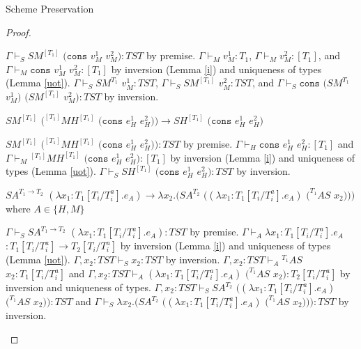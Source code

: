 \begin{theorem}{Scheme Preservation}
\begin{proof}
\begin{case}
$\Gamma\vdash_{S}SM^{[T_{1}]}$ $(\mathtt{cons}$ $v_{M}^{1}$ $v_{M}^{2}):TST$ by premise.  $\Gamma\vdash_{M}v_{M}^{1}:T_{1}$, $\Gamma\vdash_{M}v_{M}^{2}:[T_{1}]$, and $\Gamma\vdash_{M}\mathtt{cons}$ $v_{M}^{1}$ $v_{M}^{2}:[T_{1}]$ by inversion (Lemma \ref{i}) and uniqueness of types (Lemma \ref{uot}).  $\Gamma\vdash_{S}SM^{T_{1}}$ $v_{M}^{1}:TST$, $\Gamma\vdash_{S}SM^{[T_{1}]}$ $v_{M}^{2}:TST$, and $\Gamma\vdash_{S}\mathtt{cons}$ $(SM^{T_{1}}$ $v_{M}^{1})$ $(SM^{[T_{1}]}$ $v_{M}^{2}):TST$ by inversion.
\end{case}


\begin{case}
$SM^{[T_{1}]}$ $(^{[T_{1}]}MH^{[T_{1}]}$ $(\mathtt{cons}$ $e_{H}^{1}$ $e_{H}^{2}))\rightarrow SH^{[T_{1}]}$ $(\mathtt{cons}$ $e_{H}^{1}$ $e_{H}^{2})$

$SM^{[T_{1}]}$ $(^{[T_{1}]}MH^{[T_{1}]}$ $(\mathtt{cons}$ $e_{H}^{1}$ $e_{H}^{2})):TST$ by premise.  $\Gamma\vdash_{H}\mathtt{cons}$ $e_{H}^{1}$ $e_{H}^{2}:[T_{1}]$ and $\Gamma\vdash_{M}{^{[T_{1}]}M}H^{[T_{1}]}$ $(\mathtt{cons}$ $e_{H}^{1}$ $e_{H}^{2}):[T_{1}]$ by inversion (Lemma \ref{i}) and uniqueness of types (Lemma \ref{uot}).  $\Gamma\vdash_{S}SH^{[T_{1}]}$ $(\mathtt{cons}$ $e_{H}^{1}$ $e_{H}^{2}):TST$ by inversion.
\end{case}


\begin{case}
$SA^{T_{1}\rightarrow T_{2}}$ $(\lambda x_{1}:T_{1}[T_{i}/T_{i}^{a}].e_{A})\rightarrow\lambda x_{2}.(SA^{T_{2}}$ $((\lambda x_{1}:T_{1}[T_{i}/T_{i}^{a}].e_{A})$ $(^{T_{1}}AS$ $x_{2})))$ where $A\in\lbrace H,M\rbrace$

$\Gamma\vdash_{S}SA^{T_{1}\rightarrow T_{2}}$ $(\lambda x_{1}:T_{1}[T_{i}/T_{i}^{a}].e_{A}):TST$ by premise.  $\Gamma\vdash_{A}\lambda x_{1}:T_{1}[T_{i}/T_{i}^{a}].e_{A}$ $:T_{1}[T_{i}/T_{i}^{a}]\rightarrow T_{2}[T_{i}/T_{i}^{a}]$ by inversion (Lemma \ref{i}) and uniqueness of types (Lemma \ref{uot}).  $\Gamma,x_{2}:TST\vdash_{S}x_{2}:TST$ by inversion.  $\Gamma,x_{2}:TST\vdash_{A}{^{T_{1}}A}S$ $x_{2}:T_{1}[T_{i}/T_{i}^{a}]$ and $\Gamma,x_{2}:TST\vdash_{A}(\lambda x_{1}:T_{1}[T_{i}/T_{i}^{a}].e_{A})$ $(^{T_{1}}AS$ $x_{2}):T_{2}[T_{i}/T_{i}^{a}]$ by inversion and uniqueness of types.  $\Gamma,x_{2}:TST\vdash_{S}SA^{T_{2}}$ $((\lambda x_{1}:T_{1}[T_{i}/T_{i}^{a}].e_{A})$ $(^{T_{1}}AS$ $x_{2})):TST$ and $\Gamma\vdash_{S}\lambda x_{2}.(SA^{T_{2}}$ $((\lambda x_{1}:T_{1}[T_{i}/T_{i}^{a}].e_{A})$ $(^{T_{1}}AS$ $x_{2}))):TST$ by inversion.
\end{case}


\end{proof}
\end{theorem}
